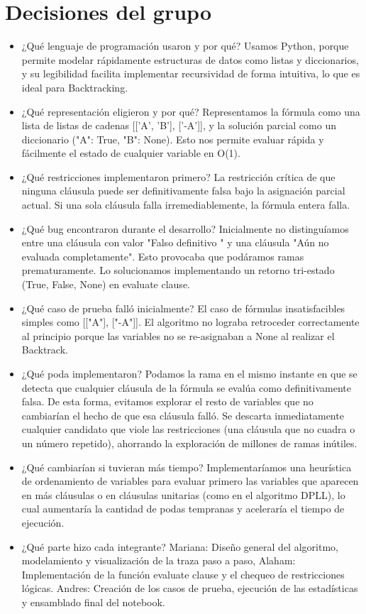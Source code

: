\documentclass[12pt,a4paper]{article}
\begin{document}
  \section{Decisiones del grupo}
\begin{itemize}
  \item ¿Qué lenguaje de programación usaron y por qué? Usamos Python, porque permite modelar rápidamente estructuras de datos como listas y diccionarios, y su legibilidad facilita implementar recursividad de forma intuitiva, lo que es ideal para Backtracking.
  \item ¿Qué representación eligieron y por qué?  Representamos la fórmula como una lista de listas de cadenas [['A', 'B'], ['-A']], y la solución parcial como un diccionario ({"A": True, "B": None}). Esto nos permite evaluar rápida y fácilmente el estado de cualquier variable en O(1).
  \item ¿Qué restricciones implementaron primero? La restricción crítica de que ninguna cláusula puede ser definitivamente falsa bajo la asignación parcial actual. Si una sola cláusula falla irremediablemente, la fórmula entera falla.
  \item ¿Qué bug encontraron durante el desarrollo? Inicialmente no distinguíamos entre una cláusula con valor "Falso definitivo " y una cláusula "Aún no evaluada completamente". Esto provocaba que podáramos ramas prematuramente. Lo solucionamos implementando un retorno tri-estado (True, False, None) en evaluate clause.
  \item ¿Qué caso de prueba falló inicialmente? El caso de fórmulas insatisfacibles simples como [["A"], ["-A"]]. El algoritmo no lograba retroceder correctamente al principio porque las variables no se re-asignaban a None al realizar el Backtrack.
  \item ¿Qué poda implementaron? Podamos la rama en el mismo instante en que se detecta que cualquier cláusula de la fórmula se evalúa como definitivamente falsa. De esta forma, evitamos explorar el resto de variables que no cambiarían el hecho de que esa cláusula falló. Se descarta inmediatamente cualquier candidato que viole las restricciones (una cláusula que no cuadra o un número repetido), ahorrando la exploración de millones de ramas inútiles.
  \item ¿Qué cambiarían si tuvieran más tiempo? Implementaríamos una heurística de ordenamiento de variables para evaluar primero las variables que aparecen en más cláusulas o en cláusulas unitarias (como en el algoritmo DPLL), lo cual aumentaría la cantidad de podas tempranas y aceleraría el tiempo de ejecución.
  \item ¿Qué parte hizo cada integrante? Mariana: Diseño general del algoritmo, modelamiento y visualización de la traza paso a paso, Alaham: Implementación de la función evaluate clause y el chequeo de restricciones lógicas. Andres: Creación de los casos de prueba, ejecución de las estadísticas y ensamblado final del notebook.
\end{itemize}
\end{document}
